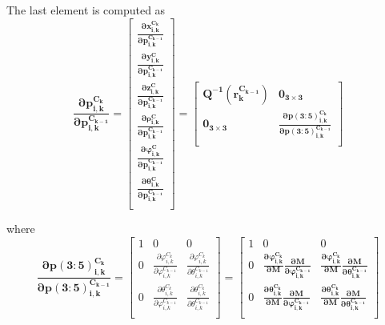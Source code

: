 \noindent The last element is computed as
\begin{equation}
\boldsymbol{\frac{\partial p_{i,k}^{C_{k }}}{\partial p_{i,k}^{C_{k-1 }}}}=
\begin{bmatrix}
\boldsymbol{\frac{\partial x_{i,k}^{C_{k}}}{\partial p_{i,k}^{C_{k-1 }}}} \\
\boldsymbol{\frac{\partial y_{i,k}^{C}}{\partial p_{i,k}^{C_{k-1 }}}} \\
\boldsymbol{\frac{\partial z_{i,k}^{C}}{\partial p_{i,k}^{C_{k-1 }}}} \\
\boldsymbol{\frac{\partial \rho _{i,k}^{C}}{\partial p_{i,k}^{C_{k-1 }}}} \\
\boldsymbol{\frac{\partial \varphi _{i, k}^{C}}{\partial p_{i,k}^{C_{k-1 }}}} \\
\boldsymbol{\frac{\partial \theta _{i, k}^{C}}{\partial p_{i,k}^{C_{k-1 }}}} \\
\end{bmatrix}=\begin{bmatrix}
\boldsymbol{Q^{-1}(r_{k}^{C_{k-1}})} & \boldsymbol{0_{3\times 3}} \\
\boldsymbol{0_{3\times 3}} & 
\boldsymbol{\frac{\partial p(3:5)_{i,k}^{C_{k}}}{\partial p(3:5)_{i,k}^{C_{k-1}}}} \\
\end{bmatrix}
\end{equation}

\noindent where
\begin{equation}
\boldsymbol{\frac{\partial p(3:5)_{i,k}^{C_{k}}}{\partial p(3:5)_{i,k}^{C_{k-1}}}}=
\begin{bmatrix}
1 & 0 & 0 \\
0 & 
\frac{\partial \varphi_{i, k}^{C_{k}}}
{\partial \varphi_{i,k}^{C_{k-1}}} & 
\frac{\partial \varphi _{i, k}^{C_{k}}}
{\partial \theta _{i, k}^{C_{k-1}}} \\
0 & 
\frac{\partial \theta _{i, k}^{C_{k}}}
{\partial \varphi _{i, k}^{C_{k-1}}} & 
\frac{\partial \theta _{i, k}^{C_{k}}}
{\partial \theta _{i, k}^{C_{k-1}}} \\
\end{bmatrix}=\begin{bmatrix}
1 & 0 & 0 \\
0 & 
\boldsymbol{\frac{\partial \varphi _{i, k}^{C_{k}}}{\partial M}
\frac{\partial M}{\partial \varphi _{i, k}^{C_{k-1}}}} & 
\boldsymbol{\frac{\partial \varphi _{i,k}^{C_{k}}}{\partial M}
\frac{\partial M}{\partial \theta _{i,k}^{C_{k-1}}}}\\
0 & 
\boldsymbol{\frac{\partial \theta _{i, k}^{C_{k}}}{\partial M}}
\boldsymbol{\frac{\partial M}{\partial \varphi _{i, k}^{C_{k-1}}}} & 
\boldsymbol{\frac{\partial \theta _{i,k}^{C_{k}}}{\partial M}}
\boldsymbol{\frac{\partial M}{\partial \theta _{i, k}^{C_{k-1}}}} \\
\end{bmatrix}
\end{equation}


